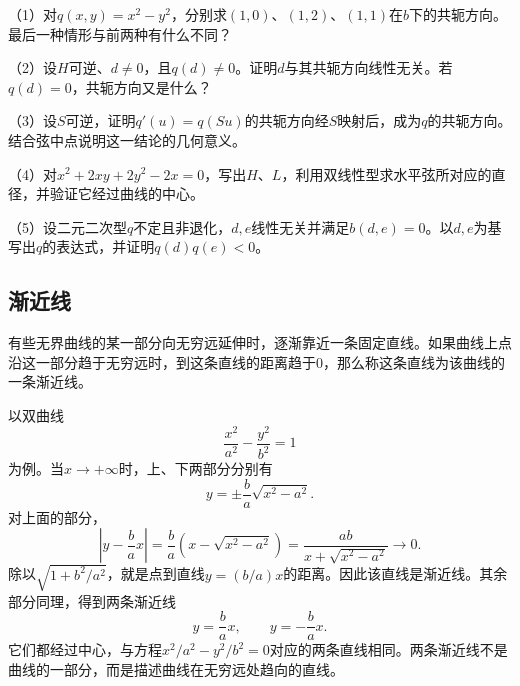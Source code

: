 \begin{exercise}
\mbox{}

\begin{samepage}
（1）对\(q(x,y)=x^2-y^2\)，分别求\((1,0)\)、\((1,2)\)、\((1,1)\)在\(b\)下的共轭方向。最后一种情形与前两种有什么不同？
\par
\end{samepage}

\begin{samepage}
（2）设\(H\)可逆、\(d\ne0\)，且\(q(d)\ne0\)。证明\(d\)与其共轭方向线性无关。若\(q(d)=0\)，共轭方向又是什么？
\par
\end{samepage}

\begin{samepage}
（3）设\(S\)可逆，证明\(q'(u)=q(Su)\)的共轭方向经\(S\)映射后，成为\(q\)的共轭方向。结合弦中点说明这一结论的几何意义。
\par
\end{samepage}

\begin{samepage}
（4）对\(x^2+2xy+2y^2-2x=0\)，写出\(H\)、\(L\)，利用双线性型求水平弦所对应的直径，并验证它经过曲线的中心。
\par
\end{samepage}

\begin{samepage}
（5）设二元二次型\(q\)不定且非退化，\(d,e\)线性无关并满足\(b(d,e)=0\)。以\(d,e\)为基写出\(q\)的表达式，并证明\(q(d)q(e)<0\)。
\par
\end{samepage}
\end{exercise}

\newpage
\subsection{渐近线}
\label{subsec:quadratic-asymptotes}

有些无界曲线的某一部分向无穷远延伸时，逐渐靠近一条固定直线。如果曲线上点沿这一部分趋于无穷远时，到这条直线的距离趋于\(0\)，那么称这条直线为该曲线的一条{\heiti{}渐近线}。

以双曲线
\begin{equation*}
    \frac{x^2}{a^2}-\frac{y^2}{b^2}=1
\end{equation*}
为例。当\(x\to+\infty\)时，上、下两部分分别有
\begin{equation*}
    y=\pm\frac ba\sqrt{x^2-a^2} .
\end{equation*}
对上面的部分，
\begin{equation*}
    \left|y-\frac bax\right|
    =\frac ba\left(x-\sqrt{x^2-a^2}\right)
    =\frac{ab}{x+\sqrt{x^2-a^2}}\longrightarrow0 .
\end{equation*}
除以\(\sqrt{1+b^2/a^2}\)，就是点到直线\(y=(b/a)x\)的距离。因此该直线是渐近线。其余部分同理，得到两条渐近线
\begin{equation}\label{eq:quadratic-hyperbola-asymptotes}
    y=\frac bax , \qquad y=-\frac bax .
\end{equation}
它们都经过中心，与方程\(x^2/a^2-y^2/b^2=0\)对应的两条直线相同。两条渐近线不是曲线的一部分，而是描述曲线在无穷远处趋向的直线。

